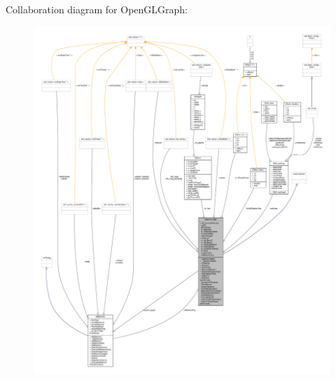 Collaboration diagram for Open\+G\+L\+Graph\+:
\nopagebreak
\begin{figure}[H]
\begin{center}
\leavevmode
\includegraphics[width=350pt]{d8/d42/classOpenGLGraph__coll__graph}
\end{center}
\end{figure}
